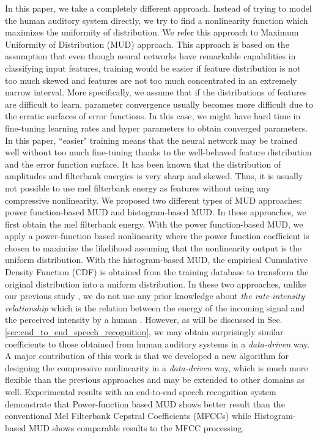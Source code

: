 \documentclass[a4paper]{article}
\begin{document}
In this paper, we take a completely different approach. Instead of trying to model
the human auditory system directly, we try to find a nonlinearity function
which maximizes the uniformity of distribution.
We refer this approach to Maximum Uniformity of Distribution (MUD) approach.
This approach is based on the assumption that even though 
neural networks have remarkable capabilities in classifying input features,
training would be easier
 if feature distribution is not too much 
skewed and features are not too much concentrated in an extremely narrow
interval. More specifically, we assume that if the distributions of features 
are difficult to learn, parameter convergence usually becomes more difficult due to the
erratic surfaces of error functions. In this case, we might have hard time 
in fine-tuning learning rates and hyper parameters to obtain converged 
parameters. In this paper, ``easier" training means that the neural network may be
trained well without too much fine-tuning thanks to the well-behaved feature
distribution and the error function surface. 
It has been known that the distribution of amplitudes \cite{C_Kim_INTERSPEECH_2008} and 
filterbank energies  \cite{C_Kim_ASRU_2009_1}
is very sharp and skewed.
Thus, it is usually not possible to use  mel filterbank energy as features
without using any compressive nonlinearity.
We proposed two different types of MUD approaches: power function-based MUD 
and histogram-based MUD. In these approaches, we first obtain the mel filterbank
energy. 
With the power function-based MUD, we apply a power-function based
nonlinearity where the power function coefficient is chosen to maximize the 
likelihood assuming that the nonlinearity output is the uniform distribution.
  With the histogram-based MUD, the empirical Cumulative Density Function (CDF) 
  is obtained from the training database to transform the original distribution
 into a uniform distribution.
In these two approaches, unlike our previous study 
\cite{C_Kim_IEEETran_2016_1, C_Kim_PhDThesis_2010}, we do not use any prior knowledge 
about {\it the rate-intensity relationship} which is the relation between 
the energy of the incoming signal and the perceived intensity 
by a human \cite{C_Kim_PhDThesis_2010}. However, as will be discussed in Sec.  
\ref{sec:end_to_end_speech_recognition}, we may obtain 
surprisingly similar coefficients  to those obtained from human
auditory systems in a {\it data-driven} way.  A major contribution of this 
work is that we developed a new algorithm for designing
the compressive nonlinearity in a {\it data-driven} way, which is much more
flexible than the previous approaches and may be extended to other domains as
well.
Experimental results with an end-to-end speech recognition system
demonstrate that Power-function based MUD shows better result than the 
  conventional Mel Filterbank Cepstral Coefficients (MFCCs) while Histogram-based
  MUD shows comparable results to the MFCC processing. 
\end{document}
